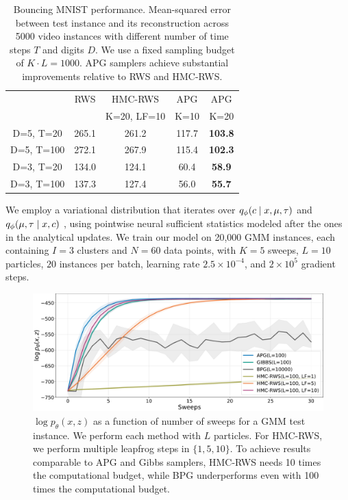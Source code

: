 \documentclass{article}
\theoremstyle{definition}
\begin{document}
\begin{table}[!b]
    \vspace{-1.5em}
    \centering
    \caption{Bouncing MNIST performance. Mean-squared error between test instance and its reconstruction across 5000 video instances with different number of time steps $T$ and digits $D$. We use a fixed sampling budget of $K \cdot L=1000$. APG samplers achieve substantial improvements relative to RWS and HMC-RWS.}
    \vspace{0.5em}
    \begin{tabularx}{\columnwidth}{ccccc}
    \toprule
        & RWS & HMC-RWS & APG & APG \\
        &  &  K=20, LF=10 & K=10 & K=20 \\
    \midrule
    D=5, T=20 & 265.1 & 261.2 & 117.7 & \textbf{103.8}\\
    \hspace{0.5em}D=5, T=100 & 272.1 & 267.9  & 115.4 & \textbf{102.3}\\
    D=3, T=20 & 134.0 & 124.1 & 60.4 & \textbf{58.9} \\   
    \hspace{0.5em}D=3, T=100 & 137.3 & 127.4 & 56.0 & \textbf{55.7} \\
    \bottomrule
    \end{tabularx}
    \label{table:mse-bmnist}
\end{table}


We employ a variational distribution that iterates over $q_\phi(c \mid x, \mu, \tau)$ and $q_\phi(\mu, \tau \mid x, c)$ , using pointwise neural sufficient statistics modeled after the ones in the analytical updates.
We train our model on 20,000 GMM instances, each containing $I = 3$ clusters and $N = 60$ data points, with $K=5$ sweeps, $L=10$ particles, $20$ instances per batch, learning rate $2.5\times10^{-4}$, and $2\times10^5$ gradient steps.
\begin{figure}[t!]
\centering
\includegraphics[width=\columnwidth]{figures/convergence_gmm_v2.pdf}
  \caption{$\log p_\theta(x, z)$ as a function of number of sweeps for a GMM test instance. We perform each method with $L$ particles. For HMC-RWS, we perform multiple leapfrog steps  in $\{1,5,10\}$. To achieve results comparable to APG and Gibbs samplers, HMC-RWS needs 10 times the computational budget, while BPG underperforms even with 100 times the computational budget.}
  \label{fig:convergence-gmm}
  \vspace{-0.75em}
\end{figure}
\end{document}
